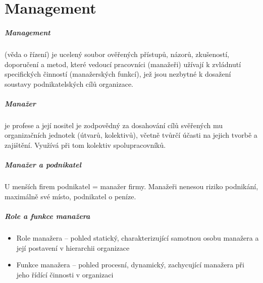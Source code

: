 \chapter{Management}

\paragraph{Management} (věda o řízení) je ucelený soubor ověřených přístupů, názorů, zkušeností, doporučení a metod, které vedoucí pracovníci (manažeři) užívají k zvládnutí specifických činností (manažerských funkcí), jež jsou nezbytné k dosažení soustavy podnikatelských cílů organizace.

\paragraph{Manažer} je profese a její nositel je zodpovědný za dosahování cílů svěřených mu organizačních jednotek (útvarů, kolektivů), včetně tvůrčí účasti na jejich tvorbě a zajištění. Využívá při tom kolektiv spolupracovníků.

\paragraph{Manažer a podnikatel} U menších firem podnikatel = manažer firmy. Manažeři nenesou riziko podnikání, maximálně své místo, podnikatel o peníze.

\paragraph{Role a funkce manažera}
\begin{itemize}
    \item Role manažera -- pohled statický, charakterizující samotnou osobu manažera a její postavení v hierarchii organizace
    \item Funkce manažera -- pohled procesní, dynamický, zachycující manažera při jeho řídící činnosti v organizaci
\end{itemize}

